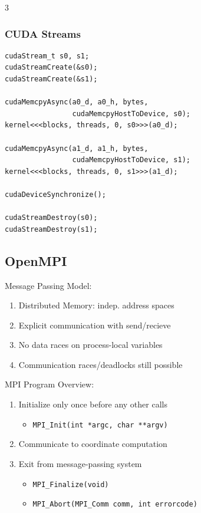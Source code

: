 \documentclass[12pt, a4paper]{article}
\begin{document}
\begin{multicols*}{3}
\subsubsection{CUDA Streams}
\begin{lstlisting}[basicstyle=\ttfamily\scriptsize]
cudaStream_t s0, s1;
cudaStreamCreate(&s0);
cudaStreamCreate(&s1);

cudaMemcpyAsync(a0_d, a0_h, bytes,
                cudaMemcpyHostToDevice, s0);
kernel<<<blocks, threads, 0, s0>>>(a0_d);

cudaMemcpyAsync(a1_d, a1_h, bytes,
                cudaMemcpyHostToDevice, s1);
kernel<<<blocks, threads, 0, s1>>>(a1_d);

cudaDeviceSynchronize();

cudaStreamDestroy(s0);
cudaStreamDestroy(s1);
\end{lstlisting}

\colbreak

\subsection{OpenMPI}
Message Passing Model:
\begin{enumerate}[\roman*.]
  \item Distributed Memory: indep. address spaces
  \item Explicit communication with send/recieve
  \item No data races on process-local variables 
  \item Communication races/deadlocks still possible
\end{enumerate}

MPI Program Overview:
\begin{enumerate}[\roman*.]
  \item Initialize only once before any other calls 
    \begin{itemize}[leftmargin=*]\vspace{3pt}
      \item \lstinline|MPI_Init(int *argc, char **argv)|
    \end{itemize}
  \item Communicate to coordinate computation
  \item Exit from message-passing system
    \begin{itemize}[leftmargin=*]\vspace{3pt}
      \item \lstinline|MPI_Finalize(void)| 
      \item \lstinline|MPI_Abort(MPI_Comm comm, int errorcode)|
    \end{itemize}
\end{enumerate}


\end{multicols*}
\end{document}
